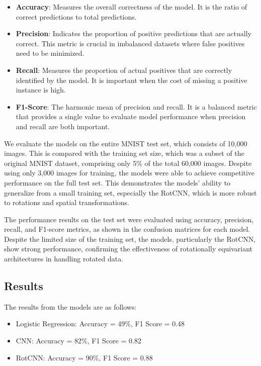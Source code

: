 \documentclass[12pt]{article}
\begin{document}
\begin{itemize}
    \item \textbf{Accuracy}: Measures the overall correctness of the model. It is the ratio of correct predictions to total predictions.
    \item \textbf{Precision}: Indicates the proportion of positive predictions that are actually correct. This metric is crucial in imbalanced datasets where false positives need to be minimized.
    \item \textbf{Recall}: Measures the proportion of actual positives that are correctly identified by the model. It is important when the cost of missing a positive instance is high.
    \item \textbf{F1-Score}: The harmonic mean of precision and recall. It is a balanced metric that provides a single value to evaluate model performance when precision and recall are both important.
\end{itemize}

We evaluate the models on the entire MNIST test set, which consists of 10,000 images. This is compared with the training set size, which was a subset of the original MNIST dataset, comprising only 5\% of the total 60,000 images. Despite using only 3,000 images for training, the models were able to achieve competitive performance on the full test set. This demonstrates the models' ability to generalize from a small training set, especially the RotCNN, which is more robust to rotations and spatial transformations.

The performance results on the test set were evaluated using accuracy, precision, recall, and F1-score metrics, as shown in the confusion matrices for each model. Despite the limited size of the training set, the models, particularly the RotCNN, show strong performance, confirming the effectiveness of rotationally equivariant architectures in handling rotated data.

\subsection{Results}

The results from the models are as follows:

\begin{itemize}
    \item Logistic Regression: Accuracy = 49\%, F1 Score = 0.48
    \item CNN: Accuracy = 82\%, F1 Score = 0.82
    \item RotCNN: Accuracy = 90\%, F1 Score = 0.88
\end{itemize}
\end{document}
